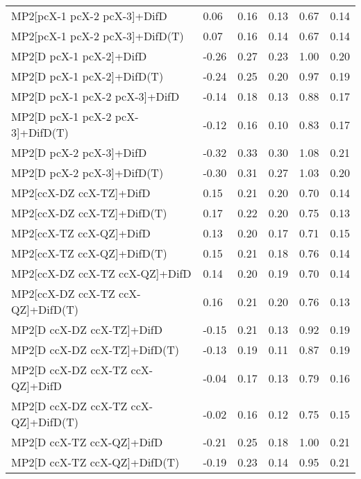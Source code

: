 \begin{table}
\begin{tabular}{l l l l l l }
    MP2[pcX-1 pcX-2 pcX-3]+DifD & 0.06 & 0.16 & 0.13 & 0.67 & 0.14 \\ 
    MP2[pcX-1 pcX-2 pcX-3]+DifD(T) & 0.07 & 0.16 & 0.14 & 0.67 & 0.14 \\ 
    MP2[D pcX-1 pcX-2]+DifD & -0.26 & 0.27 & 0.23 & 1.00 & 0.20 \\ 
    MP2[D pcX-1 pcX-2]+DifD(T) & -0.24 & 0.25 & 0.20 & 0.97 & 0.19 \\ 
    MP2[D pcX-1 pcX-2 pcX-3]+DifD & -0.14 & 0.18 & 0.13 & 0.88 & 0.17 \\ 
    MP2[D pcX-1 pcX-2 pcX-3]+DifD(T) & -0.12 & 0.16 & 0.10 & 0.83 & 0.17 \\ 
    MP2[D pcX-2 pcX-3]+DifD & -0.32 & 0.33 & 0.30 & 1.08 & 0.21 \\ 
    MP2[D pcX-2 pcX-3]+DifD(T) & -0.30 & 0.31 & 0.27 & 1.03 & 0.20 \\ 
    MP2[ccX-DZ ccX-TZ]+DifD & 0.15 & 0.21 & 0.20 & 0.70 & 0.14 \\ 
    MP2[ccX-DZ ccX-TZ]+DifD(T) & 0.17 & 0.22 & 0.20 & 0.75 & 0.13 \\ 
    MP2[ccX-TZ ccX-QZ]+DifD & 0.13 & 0.20 & 0.17 & 0.71 & 0.15 \\ 
    MP2[ccX-TZ ccX-QZ]+DifD(T) & 0.15 & 0.21 & 0.18 & 0.76 & 0.14 \\ 
    MP2[ccX-DZ ccX-TZ ccX-QZ]+DifD & 0.14 & 0.20 & 0.19 & 0.70 & 0.14 \\ 
    MP2[ccX-DZ ccX-TZ ccX-QZ]+DifD(T) & 0.16 & 0.21 & 0.20 & 0.76 & 0.13 \\ 
    MP2[D ccX-DZ ccX-TZ]+DifD & -0.15 & 0.21 & 0.13 & 0.92 & 0.19 \\ 
    MP2[D ccX-DZ ccX-TZ]+DifD(T) & -0.13 & 0.19 & 0.11 & 0.87 & 0.19 \\ 
    MP2[D ccX-DZ ccX-TZ ccX-QZ]+DifD & -0.04 & 0.17 & 0.13 & 0.79 & 0.16 \\ 
    MP2[D ccX-DZ ccX-TZ ccX-QZ]+DifD(T) & -0.02 & 0.16 & 0.12 & 0.75 & 0.15 \\ 
    MP2[D ccX-TZ ccX-QZ]+DifD & -0.21 & 0.25 & 0.18 & 1.00 & 0.21 \\ 
    MP2[D ccX-TZ ccX-QZ]+DifD(T) & -0.19 & 0.23 & 0.14 & 0.95 & 0.21 \\ 
    \bottomrule
  \end{tabular}
\end{table}
